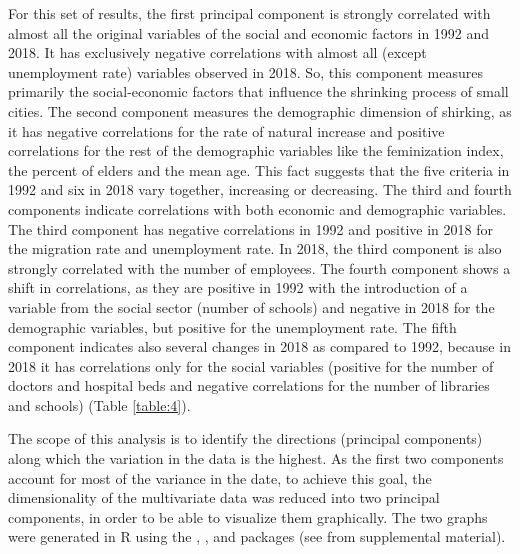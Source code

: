 For this set of results, the first principal component is strongly correlated with almost all the original variables of the social and economic factors in 1992 and 2018. It has exclusively negative correlations with almost all (except unemployment rate) variables observed in 2018. So, this component measures primarily the social-economic factors that influence the shrinking process of small cities. The second component measures the demographic dimension of shirking, as it has negative correlations for the rate of natural increase and positive correlations for the rest of the demographic variables like the feminization index, the percent of elders and the mean age. This fact suggests that the five criteria in 1992 and six in 2018 vary together, increasing or decreasing. The third and fourth components indicate correlations with both economic and demographic variables. The third component has negative correlations in 1992 and positive in 2018 for the migration rate and unemployment rate. In 2018, the third component is also strongly correlated with the number of employees. The fourth component shows a shift in correlations, as they are positive in 1992 with the introduction of a variable from the social sector (number of schools) and negative in 2018 for the demographic variables, but positive for the unemployment rate. The fifth component indicates also several changes in 2018 as compared to 1992, because in 2018 it has correlations only for the social variables (positive for the number of doctors and hospital beds and negative correlations for the number of libraries and schools) (Table \ref{table:4}).

The scope of this analysis is to identify the directions (principal components) along which the variation in the data is the highest. As the first two components account for most of the variance in the date, to achieve this goal, the dimensionality of the multivariate data was reduced into two principal components, in order to be able to visualize them graphically. The two graphs were generated in R using the , ,  and  packages (see  from supplemental material).

